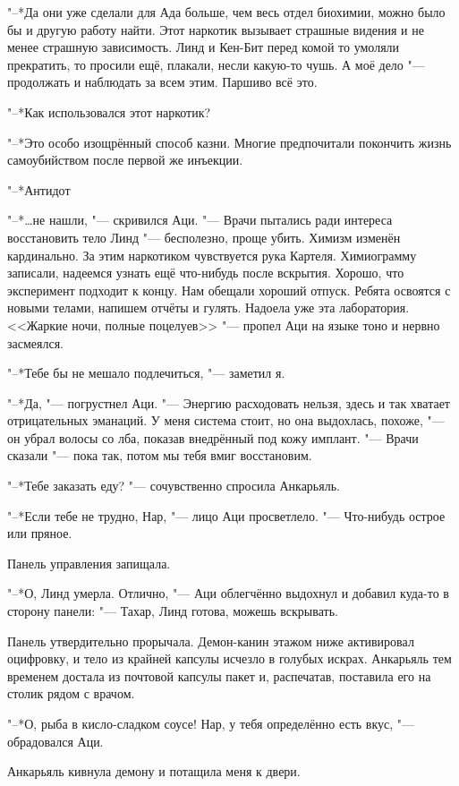 \documentclass[a4paper,10pt,fleqn]{book}
\newcommand{\ldotst}{\so{...}\xspace}
\newcommand{\ldotsq}{\so{?\hbox{\hspace{-.212em}}..}\xspace}
\begin{document}
"--*Да они уже сделали для Ада больше, чем весь отдел биохимии, можно было бы и другую работу найти.
Этот наркотик вызывает страшные видения и не менее страшную зависимость.
Линд и Кен-Бит перед комой то умоляли прекратить, то просили ещё, плакали, несли какую-то чушь.
А моё дело "--- продолжать и наблюдать за всем этим.
Паршиво всё это.

"--*Как использовался этот наркотик?

"--*Это особо изощрённый способ казни.
Многие предпочитали покончить жизнь самоубийством после первой же инъекции.

"--*Антидот\ldotsq

"--*\ldots не нашли, "--- скривился Аци.
"--- Врачи пытались ради интереса восстановить тело Линд "--- бесполезно, проще убить.
Химизм изменён кардинально.
За этим наркотиком чувствуется рука Картеля.
Химиограмму записали, надеемся узнать ещё что-нибудь после вскрытия.
Хорошо, что эксперимент подходит к концу.
Нам обещали хороший отпуск.
Ребята освоятся с новыми телами, напишем отчёты и гулять.
Надоела уже эта лаборатория.
<<Жаркие ночи, полные поцелуев\ldotst>> "--- пропел Аци на языке тоно и нервно засмеялся.

"--*Тебе бы не мешало подлечиться, "--- заметил я.

"--*Да, "--- погрустнел Аци.
"--- Энергию расходовать нельзя, здесь и так хватает отрицательных эманаций.
У меня система стоит, но она выдохлась, похоже, "--- он убрал волосы со лба, показав внедрённый под кожу имплант.
"--- Врачи сказали "--- пока так, потом мы тебя вмиг восстановим.

"--*Тебе заказать еду? "--- сочувственно спросила Анкарьяль.

"--*Если тебе не трудно, Нар, "--- лицо Аци просветлело.
"--- Что-нибудь острое или пряное.

Панель управления запищала.

"--*О, Линд умерла.
Отлично, "--- Аци облегчённо выдохнул и добавил куда-то в сторону панели:
"--- Тахар, Линд готова, можешь вскрывать.

Панель утвердительно прорычала.
Демон-канин этажом ниже активировал оцифровку, и тело из крайней капсулы исчезло в голубых искрах.
Анкарьяль тем временем достала из почтовой капсулы пакет и, распечатав, поставила его на столик рядом с врачом.

"--*О, рыба в кисло-сладком соусе!
Нар, у тебя определённо есть вкус, "--- обрадовался Аци.

Анкарьяль кивнула демону и потащила меня к двери.
\end{document}
